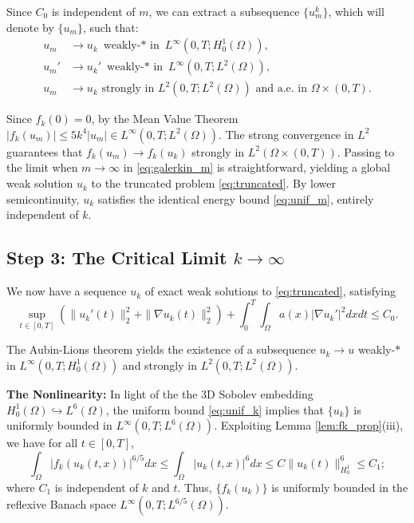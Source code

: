 \documentclass[11pt,letterpaper]{amsart}
\begin{document}
Since $C_0$ is independent of $m$, we can extract a subsequence $\{u_m^k\}$, which will denote by $\{u_m\}$, such that:
\begin{align}
    u_m &\to u_k \text{ weakly-$\ast$ in } L^\infty(0,T; H_0^1(\Omega)), \\
    u_m' &\to u_k' \text{ weakly-$\ast$ in } L^\infty(0,T; L^2(\Omega)), \\
    u_m &\to u_k \text{ strongly in } L^2(0,T; L^2(\Omega)) \text{ and a.e. in } \Omega \times (0,T).
\end{align}

Since $f_k(0)=0$, by the Mean Value Theorem $|f_k(u_m)| \le 5k^4 |u_m| \in L^\infty(0,T; L^2(\Omega))$. The strong convergence in $L^2$ guarantees that $f_k(u_m) \to f_k(u_k)$ strongly in $L^2(\Omega \times (0,T))$. Passing to the limit when $m \to \infty$ in \eqref{eq:galerkin_m} is straightforward, yielding a global weak solution $u_k$ to the truncated problem \eqref{eq:truncated}. By lower semicontinuity, $u_k$ satisfies the identical energy bound \eqref{eq:unif_m}, entirely independent of $k$.

\subsection{Step 3: The Critical Limit $k \to \infty$}

We now have a sequence $u_k$ of exact weak solutions to \eqref{eq:truncated}, satisfying
\begin{equation}\label{eq:unif_k}
\sup_{t \in [0,T]} \left( \|u_k'(t)\|_2^2 + \|\nabla u_k(t)\|_2^2 \right) + \int_0^T \int_\Omega a(x) |\nabla u_k'|^2 dx dt \le C_0.
\end{equation}

The Aubin-Lions theorem yields the existence of a subsequence $u_k \to u$ weakly-$\ast$ in $L^\infty(0,T; H_0^1(\Omega))$ and strongly in $L^2(0,T; L^2(\Omega))$.


\textbf{The Nonlinearity:} In light of the  the 3D Sobolev embedding $H_0^1(\Omega) \hookrightarrow L^6(\Omega)$, the uniform bound \eqref{eq:unif_k} implies that $\{u_k\}$ is uniformly bounded in $L^\infty(0,T; L^6(\Omega))$.
Exploiting Lemma \ref{lem:fk_prop}(iii), we have for all $t\in [0,T]$,
\begin{equation}
\int_\Omega |f_k(u_k(t,x))|^{6/5} dx \le \int_\Omega |u_k(t,x)|^6 dx \le C \|u_k(t)\|_{H_0^1}^6 \le C_1;
\end{equation}
where $C_1$ is independent of $k$ and $t$. Thus, $\{f_k(u_k)\}$ is uniformly bounded in the reflexive Banach space $L^\infty(0,T; L^{6/5}(\Omega))$.
\end{document}
